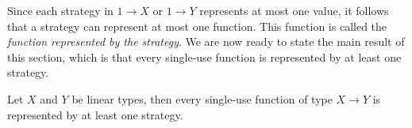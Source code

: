 \documentclass[10pt,a4paper]{amsart}
\numberwithin{equation}{section}
\theoremstyle{plain}
\begin{document}
Since each strategy in $1 \to X$ or $1 \to Y$ represents at most one value, it follows that a strategy can represent at most one function. This function is called the \emph{function represented by the strategy}.  We are now ready to state the main result of this section, which is that every single-use function is represented by at least one strategy.
\begin{lemma}\label{lem:all-functions-represented}
    Let $X$ and $Y$ be linear types, then every single-use function of type $X \to Y$ is represented by at least one strategy. 
\end{lemma}
\end{document}
